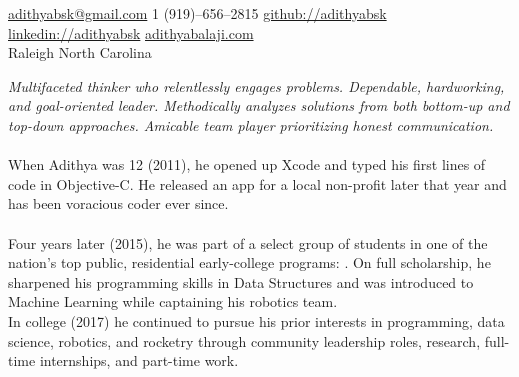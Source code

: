 \documentclass[10pt,letterpaper]{article}
\begin{document}
\sloppy  %


\nobreakvspace{0.3em}  %

\noindent
\href{mailto:adithyabsk@gmail.com}{adithyabsk\mbox{}@\mbox{}gmail.com}\sbull{}
\textsmaller{+}1 (919)--656--2815\sbull{}
\href{https://github.com/adithyabsk}{github://adithyabsk}\sbull{}
\href{https://linkedin.com/in/adithyabsk}{linkedin://adithyabsk}\sbull{}
\href{https://www.adithyabalaji.com}{adithyabalaji.com}\\
Raleigh\sbull{}
North Carolina\spacedhrule{0.9em}{-0.4em}  %


\vspace{-1.3em}  %
\begin{multicols}{2}  %
	\noindent
	\emph{Multifaceted thinker who relentlessly engages problems.
		Dependable, hardworking, and goal-oriented leader.
		Methodically analyzes solutions from both bottom-up and top-down approaches. Amicable team player prioritizing honest communication.
	}
	\\
	\\
	When Adithya was 12 (2011), he opened up Xcode and typed his first lines of code in Objective-C.
	He released an  app for a local non-profit later that year and has been voracious coder ever since.\\ \\

	Four years later (2015), he was part of a select group of students in one of the nation's top public, residential early-college programs: .
	On full scholarship, he sharpened his programming skills in Data Structures and was introduced to Machine Learning while captaining his robotics team.\\

	In college (2017) he continued to pursue his prior interests in programming, data science, robotics, and rocketry through community leadership roles, research, full-time internships, and part-time work.
\end{multicols}\spacedhrule{0em}{-0.4em}
\end{document}
